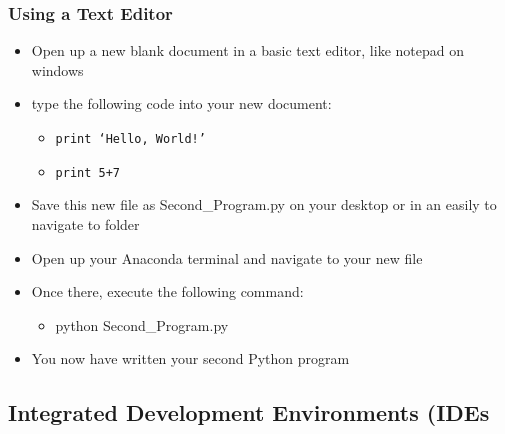 \documentclass[mini frame in current subsection]{beamer}
\begin{document}
	
		\begin{frame}
			\frametitle{Using a Text Editor}
			\begin{itemize}
				\vfill \item  Open up a new blank document in a basic text editor, like notepad on windows
				\vfill \item  type the following code into your new document:
					\begin{itemize}
						\item  \texttt{print `Hello, World!'}
						\item  \texttt{print 5+7}
					\end{itemize}
				\vfill \item  Save this new file as Second\_Program.py on your desktop or in an easily to navigate to folder
				\vfill \item  Open up your Anaconda terminal and navigate to your new file

				\vfill \item  Once there, execute the following command:
					\begin{itemize}
						\item  python Second\_Program.py
					\end{itemize}
				\vfill \item  You now have written your second Python program
			\end{itemize}		
				
		\end{frame}
		
	\subsection{Integrated Development Environments (IDEs}
	
\end{document}
